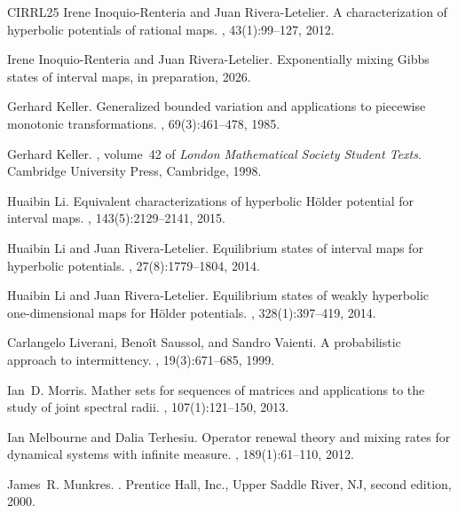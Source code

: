 \documentclass[12pt]{amsart}
\numberwithin{equation}{section} %
\numberwithin{figure}{section} %
\theoremstyle{plain}
\theoremstyle{definition}
\theoremstyle{remark}
\theoremstyle{citing}
\renewcommand{\=}{\coloneqq}
\begin{document}
\begin{thebibliography}{CIRRL25}
Irene Inoquio-Renteria and Juan Rivera-Letelier.
\newblock A characterization of hyperbolic potentials of rational maps.
, 43(1):99--127, 2012.

Irene Inoquio-Renteria and Juan Rivera-Letelier.
\newblock Exponentially mixing {Gibbs} states of interval maps, in preparation, 2026.

Gerhard Keller.
\newblock Generalized bounded variation and applications to piecewise monotonic transformations.
, 69(3):461--478, 1985.

Gerhard Keller.
, volume~42 of {\em London Mathematical Society Student Texts}.
\newblock Cambridge University Press, Cambridge, 1998.

Huaibin Li.
\newblock Equivalent characterizations of hyperbolic {H}\"older potential for interval maps.
, 143(5):2129--2141, 2015.

Huaibin Li and Juan Rivera-Letelier.
\newblock Equilibrium states of interval maps for hyperbolic potentials.
, 27(8):1779--1804, 2014.

Huaibin Li and Juan Rivera-Letelier.
\newblock Equilibrium states of weakly hyperbolic one-dimensional maps for {H}\"older potentials.
, 328(1):397--419, 2014.

Carlangelo Liverani, Beno\^it Saussol, and Sandro Vaienti.
\newblock A probabilistic approach to intermittency.
, 19(3):671--685, 1999.

Ian~D. Morris.
\newblock Mather sets for sequences of matrices and applications to the study of joint spectral radii.
, 107(1):121--150, 2013.

Ian Melbourne and Dalia Terhesiu.
\newblock Operator renewal theory and mixing rates for dynamical systems with infinite measure.
, 189(1):61--110, 2012.

James~R. Munkres.
.
\newblock Prentice Hall, Inc., Upper Saddle River, NJ, second edition, 2000.


\end{thebibliography}
\end{document}
